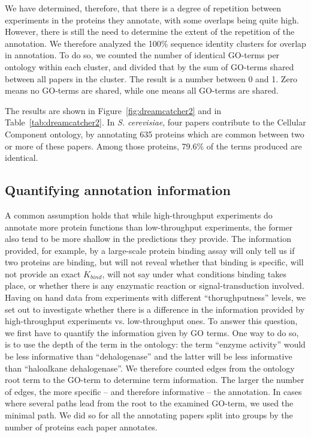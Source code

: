 \documentclass[12pt]{article}
\begin{document}
We have determined, therefore, that there is a degree of repetition between experiments in
the proteins they annotate, with some overlaps being quite high. However, there is still the
need to determine the extent of the repetition of the annotation. We therefore analyzed the
100\% sequence identity clusters for overlap in annotation.  To do so, we counted the number
of identical GO-terms per ontology within each cluster, and divided that by the sum of
GO-terms shared between all papers in the cluster. The result is a number between 0 and 1.
Zero means no GO-terms are shared, while one means all GO-terms are shared. 

The results are shown in Figure~\ref{fig:dreamcatcher2} and in
Table~\ref{tab:dreamcatcher2}. In \textit{S.  cerevisiae}, four papers contribute to the
Cellular Component ontology, by annotating 635 proteins which are common between two or more
of these papers. Among those proteins,  79.6\% of the terms produced are identical.

\subsection*{Quantifying annotation information}

A common assumption holds that while high-throughput experiments do annotate more protein
functions than low-throughput experiments, the former also tend to be more shallow in the
predictions they provide. The information provided, for example, by a large-scale protein
binding assay will only tell us if two proteins are binding, but will not reveal whether
that binding is specific, will not provide an exact $K_{bind}$, will not say under what
conditions binding takes place, or whether there is any enzymatic reaction or
signal-transduction involved. Having on hand data from experiments with different
``thorughputness'' levels,  we set out to investigate whether there is a difference in the
information provided by high-throughput experiments vs. low-throughput ones. To answer this
question, we first have to quantify the information given by GO terms. One way to do so, is
to use the depth of the term in the ontology: the term ``enzyme activity'' would be less
informative than ``dehalogenase'' and the latter will be less informative than ``haloalkane
dehalogenase''.  We therefore counted edges from the ontology root term to the GO-term to
determine term information. The larger the number of edges, the more specific -- and
therefore informative -- the annotation. In cases where several paths lead from the root to
the examined GO-term, we used the minimal path. We did so for all the annotating papers
split into groups by the number of proteins each paper annotates. 
\end{document}
